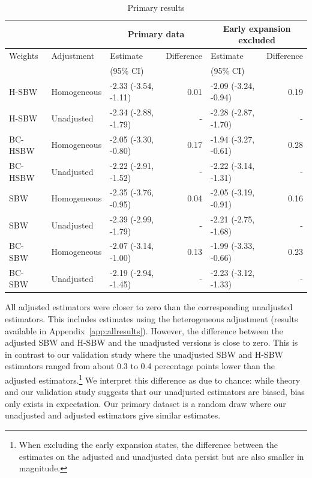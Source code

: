 \documentclass[aoas]{imsart}
\theoremstyle{plain}
\theoremstyle{remark}
\begin{document}
\begin{table}[ht]
\begin{longtable}{lllrlr}\caption{Primary results}\label{tab:mainresults} \\
 \hline
 &  & \multicolumn{2}{c}{Primary data} & \multicolumn{2}{c}{Early expansion 
 excluded} \\
  \hline
Weights & Adjustment & Estimate  & Difference & Estimate & Difference\\ 
 &  & (95\% CI) &  & (95\% CI) & \\
  \hline
H-SBW & Homogeneous & -2.33 (-3.54, -1.11) & 0.01 & -2.09 (-3.24, -0.94) & 0.19 \\ 
  H-SBW & Unadjusted & -2.34 (-2.88, -1.79) & - & -2.28 (-2.87, -1.70) & - \\ 
  BC-HSBW & Homogeneous & -2.05 (-3.30, -0.80) & 0.17 & -1.94 (-3.27, -0.61) & 0.28 \\ 
  BC-HSBW & Unadjusted & -2.22 (-2.91, -1.52) & - & -2.22 (-3.14, -1.31) & - \\ 
  SBW & Homogeneous & -2.35 (-3.76, -0.95) & 0.04 & -2.05 (-3.19, -0.91) & 0.16 \\ 
  SBW & Unadjusted & -2.39 (-2.99, -1.79) & - & -2.21 (-2.75, -1.68) & - \\ 
  BC-SBW & Homogeneous & -2.07 (-3.14, -1.00) & 0.13 & -1.99 (-3.33, -0.66) & 0.23 \\ 
  BC-SBW & Unadjusted & -2.19 (-2.94, -1.45) & - & -2.23 (-3.12, -1.33) & - \\    
  \hline
\end{longtable}
\end{table}

All adjusted estimators were closer to zero than the corresponding unadjusted estimators. This includes estimates using the heterogeneous adjustment (results available in Appendix~\ref{app:allresults}). However, the difference between the adjusted SBW and H-SBW and the unadjusted versions is close to zero. This is in contrast to our validation study where the unadjusted SBW and H-SBW estimators ranged from about 0.3 to 0.4 percentage points lower than the adjusted estimators.\footnote{When excluding the early expansion states, the difference between the estimates on the adjusted and unadjusted data persist but are also smaller in magnitude.} We interpret this difference as due to chance: while theory and our validation study suggests that our unadjusted estimators are biased, bias only exists in expectation. Our primary dataset is a random draw where our unadjusted and adjusted estimators give similar estimates.
\end{document}
